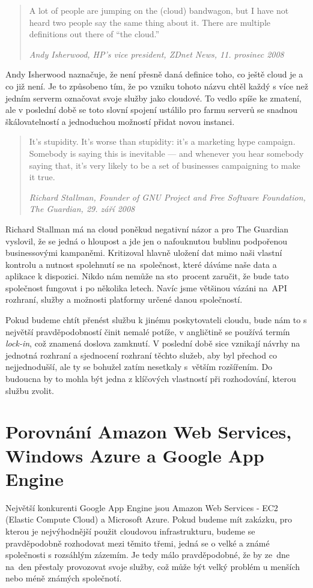 \begin{quotation}
A lot of people are jumping on the (cloud) bandwagon, but I have not heard two people say the same thing about it. There are multiple definitions out there of “the cloud.”

\em Andy Isherwood, HP’s vice president, ZDnet News, 11. prosinec 2008
\end{quotation}

Andy Isherwood naznačuje, že není přesně daná definice toho, co ještě cloud je a co již není. Je to způsobeno tím, že po vzniku tohoto názvu chtěl každý s více než jedním serverm označovat svoje služby jako cloudové. To vedlo spíše ke zmatení, ale v poslední době se toto slovní spojení ustálilo pro farmu serverů se snadnou škálovatelností a jednoduchou možností přidat novou instanci.

\begin{quotation}
It’s stupidity. It’s worse than stupidity: it’s a marketing hype campaign. Somebody is saying this is inevitable — and whenever you hear somebody saying that, it’s very likely to be a set of businesses campaigning to make it true.

\em Richard Stallman, Founder of GNU Project and Free Software Foundation, The Guardian, 29. září 2008
\end{quotation}

Richard Stallman má na cloud poněkud negativní názor a pro The Guardian vyslovil, že se jedná o hloupost a jde jen o nafouknutou bublinu podpořenou businessovými kampaněmi. Kritizoval hlavně uložení dat mimo naši vlastní kontrolu a nutnost spolehnutí se na~společnost, které dáváme naše data a aplikace k dispozici. Nikdo nám nemůže na sto~procent zaručit, že bude tato společnost fungovat i po několika letech. Navíc jsme většinou vázáni na~API rozhraní, služby a možnosti platformy určené danou společností.

Pokud budeme chtít přenést službu k jinému poskytovateli cloudu, bude nám to s největší pravděpodobností činit nemalé potíže, v angličtině se používá termín \emph{lock-in}, což znamená doslova zamknutí. V poslední době sice vznikají návrhy na jednotná rozhraní a sjednocení rozhraní těchto služeb, aby byl přechod co nejjednodušší, ale ty se bohužel zatím nesetkaly s~větším rozšířením. Do budoucna by to mohla být jedna z klíčových vlastností při rozhodování, kterou službu zvolit.

\section{Porovnání Amazon Web Services, Windows Azure a Google App Engine}
Největší konkurenti Google App Engine jsou Amazon Web Services - EC2 (Elastic Compute Cloud) a Microsoft Azure. Pokud budeme mít zakázku, pro kterou je nejvýhodnější použit cloudovou infrastrukturu, budeme se pravděpodobně rozhodovat mezi těmito třemi, jedná se o velké a známé společnosti s rozsáhlým zázemím. Je tedy málo pravděpodobné, že by ze~dne na~den přestaly provozovat svoje služby, což může být velký problém u menších nebo méně známých společnotí.

